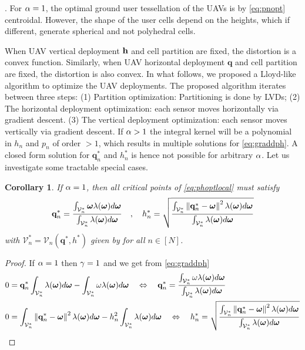 \documentclass[smallabstract,smallcaptions]{dccpaper}
\newenvironment{remark}{\par\vspace{1.5ex}\noindent{\em Remark\/}.}{\par\vspace{1.5ex}}
\renewcommand{\vp}{\mathbf q}
\newcommand{\df}{\ensuremath{\lam}}         %
\newcommand{\bP}{\ensuremath{\vp}}          %
\newcommand{\bH}{\ensuremath{\vh}}          %
\newcommand{\Vor}{\ensuremath{\mathcal{V}}}         %
\newtheorem{corollary}{Corollary}
\begin{document}
%
\fi
\begin{remark}
  For $\alpha=1$, the optimal ground user tessellation of the UAVs is by \eqref{eq:pnopt} centroidal. However, the shape of
  the user cells depend on the heights, which if different, generate spherical and not polyhedral cells. 
\end{remark}

When UAV vertical deployment $\bH$ and cell partition are fixed, the distortion is a convex function.  Similarly, when
UAV horizontal deployment $\bP$ and cell partition are fixed, the distortion is also convex.  In what follows,
we proposed a Lloyd-like algorithm to optimize the UAV deployments.  The proposed algorithm iterates between three
steps: (1) Partition optimization: Partitioning is done by LVDs; (2) The horizontal deployment optimization: each sensor
moves horizontally via gradient descent.  (3) The vertical deployment optimization: each sensor moves vertically via
gradient descent.
\fi %
If $\alpha>1$ the integral kernel will be a polynomial in $h_n$ and $p_n$ of order $>1$, which results in multiple
solutions for \eqref{eq:graddph}. A closed form solution for $\vp_n^*$ and $h_n^*$ is hence not possible for arbitrary
$\alpha$. Let us investigate some tractable special cases.   
%
\begin{corollary}\label{cor:alponedifheight}
  If $\alpha=1$, then all critical points  of \eqref{eq:phoptlocal} must satisfy 
  \begin{align}
    \vp_n^* = \frac{\int_{\Vor^*_n} \vome \df(\vome)d\vome}{\int_{\Vor^*_n} \df(\vome)d\vome}\quad,\quad 
    h_n^* = \sqrt{\frac{\int_{\Vor^*_n}\Norm{\vp_n^*-\vome}^2 \df(\vome)d\vome}{\int_{\Vor^*_n} \df(\vome)d\vome}}\label{eq:pnhn}
  \end{align}
  with  $\Vor_n^*=\Vor_n(\vp^*,h^*)$ given by  for all $n\in[N]$.
\end{corollary}
%
\begin{proof}
  If $\alpha=1$ then $\gamma=1$ and we get from \eqref{eq:graddph}
  \begin{align}
    &0= \vp_n^*\int_{\Vor^*_n} \df(\vome)d\vome- \int_{\Vor_n^*} \ome\df(\vome)d\vome
   \quad \LRA\quad 
    \vp_n^*= \frac{\int_{\Vor_n^*} \ome\df(\vome)d\vome}{\int_{\Vor^*_n} \df(\vome)d\vome }\\
    &0= \int_{\Vor_n^*} \Norm{\vp_n^*-\vome}^2 \df(\vome) d\vome - h_n^2\int_{\Vor^*_n}  \df(\vome)d \vome
   \quad \LRA \quad
    h_n^*= \sqrt{\frac{\int_{\Vor_n^*} \Norm{\vp_n^*-\vome}^2\df(\vome)d\vome}{\int_{\Vor^*_n}  \df(\vome)d\vome }}
  \end{align}
\end{proof}
\fi %
%
\end{document}
